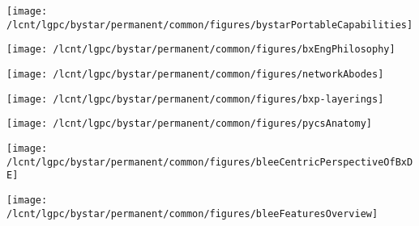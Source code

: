 \documentclass[twoside]{book}
\begin{document}
\begin{center}
\texttt{[image: /lcnt/lgpc/bystar/permanent/common/figures/bystarPortableCapabilities]}
\end{center}

\clearpage%

\begin{center}
\texttt{[image: /lcnt/lgpc/bystar/permanent/common/figures/bxEngPhilosophy]}
\end{center}

\clearpage%

\begin{center}
\texttt{[image: /lcnt/lgpc/bystar/permanent/common/figures/networkAbodes]}
\end{center}

\clearpage%

\begin{center}
\texttt{[image: /lcnt/lgpc/bystar/permanent/common/figures/bxp-layerings]}
\end{center}

\clearpage%

\begin{center}
\texttt{[image: /lcnt/lgpc/bystar/permanent/common/figures/pycsAnatomy]}
\end{center}

\clearpage%

\begin{center}
\texttt{[image: /lcnt/lgpc/bystar/permanent/common/figures/bleeCentricPerspectiveOfBxDE]}
\end{center}

\clearpage%

\begin{center}
\texttt{[image: /lcnt/lgpc/bystar/permanent/common/figures/bleeFeaturesOverview]}
\end{center}

\clearpage%
\end{document}

